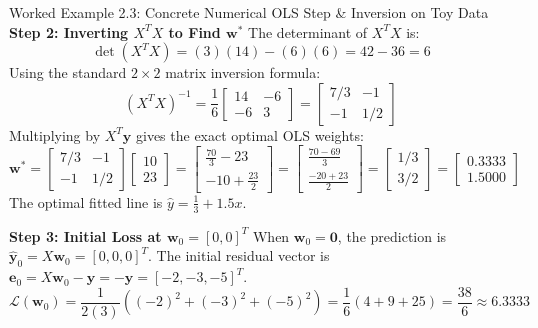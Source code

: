 \begin{examplebox}[breakable]{Worked Example 2.3: Concrete Numerical OLS Step \& Inversion on Toy Data}
\textbf{Step 2: Inverting $X^T X$ to Find $\mathbf{w}^*$}
The determinant of $X^T X$ is:
\begin{equation*}
\det(X^T X) = (3)(14) - (6)(6) = 42 - 36 = 6
\end{equation*}
Using the standard $2 \times 2$ matrix inversion formula:
\begin{equation*}
(X^T X)^{-1} = \frac{1}{6} \begin{bmatrix} 14 & -6 \\ -6 & 3 \end{bmatrix} = \begin{bmatrix} 7/3 & -1 \\ -1 & 1/2 \end{bmatrix}
\end{equation*}
Multiplying by $X^T \mathbf{y}$ gives the exact optimal OLS weights:
\begin{equation*}
\mathbf{w}^* = \begin{bmatrix} 7/3 & -1 \\ -1 & 1/2 \end{bmatrix} \begin{bmatrix} 10 \\ 23 \end{bmatrix} = \begin{bmatrix} \frac{70}{3} - 23 \\ -10 + \frac{23}{2} \end{bmatrix} = \begin{bmatrix} \frac{70 - 69}{3} \\ \frac{-20 + 23}{2} \end{bmatrix} = \begin{bmatrix} 1/3 \\ 3/2 \end{bmatrix} = \mathbf{\begin{bmatrix} 0.3333 \\ 1.5000 \end{bmatrix}}
\end{equation*}
The optimal fitted line is $\hat{y} = \frac{1}{3} + 1.5 x$.

\textbf{Step 3: Initial Loss at $\mathbf{w}_0 = [0, 0]^T$}
When $\mathbf{w}_0 = \mathbf{0}$, the prediction is $\hat{\mathbf{y}}_0 = X\mathbf{w}_0 = [0, 0, 0]^T$. The initial residual vector is $\mathbf{e}_0 = X\mathbf{w}_0 - \mathbf{y} = -\mathbf{y} = [-2, -3, -5]^T$.
\begin{equation*}
\mathcal{L}(\mathbf{w}_0) = \frac{1}{2(3)} \left( (-2)^2 + (-3)^2 + (-5)^2 \right) = \frac{1}{6} (4 + 9 + 25) = \frac{38}{6} \approx \mathbf{6.3333}
\end{equation*}


\end{examplebox}
